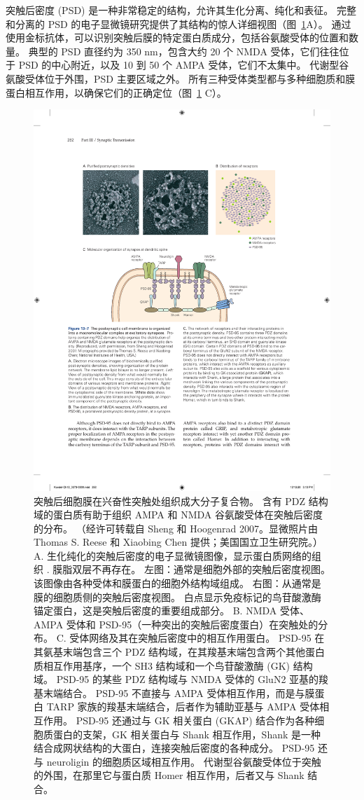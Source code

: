 突触后密度 (PSD) 是一种非常稳定的结构，允许其生化分离、纯化和表征。
完整和分离的 PSD 的电子显微镜研究提供了其结构的惊人详细视图（图~\ref{fig:13_7}A）。 
通过使用金标抗体，可以识别突触后膜的特定蛋白质成分，包括谷氨酸受体的位置和数量。
典型的 PSD 直径约为 350 nm，包含大约 20 个 NMDA 受体，它们往往位于 PSD 的中心附近，以及 10 到 50 个 AMPA 受体，它们不太集中。
代谢型谷氨酸受体位于外围，PSD 主要区域之外。
所有三种受体类型都与多种细胞质和膜蛋白相互作用，以确保它们的正确定位（图~\ref{fig:13_7} C）。


\begin{figure}[htbp]
	\centering
	\includegraphics[width=0.7\linewidth]{chap13/fig_13_7}
	\caption{突触后细胞膜在兴奋性突触处组织成大分子复合物。 含有 PDZ 结构域的蛋白质有助于组织 AMPA 和 NMDA 谷氨酸受体在突触后密度的分布。 （经许可转载自 Sheng 和 Hoogenrad 2007。显微照片由 Thomas S. Reese 和 Xiaobing Chen 提供；美国国立卫生研究院。）A. 生化纯化的突触后密度的电子显微镜图像，显示蛋白质网络的组织 . 膜脂双层不再存在。 左图：通常是细胞外部的突触后密度视图。 该图像由各种受体和膜蛋白的细胞外结构域组成。 右图：从通常是膜的细胞质侧的突触后密度视图。 白点显示免疫标记的鸟苷酸激酶锚定蛋白，这是突触后密度的重要组成部分。 B. NMDA 受体、AMPA 受体和 PSD-95（一种突出的突触后密度蛋白）在突触处的分布。 C. 受体网络及其在突触后密度中的相互作用蛋白。 PSD-95 在其氨基末端包含三个 PDZ 结构域，在其羧基末端包含两个其他蛋白质相互作用基序，一个 SH3 结构域和一个鸟苷酸激酶 (GK) 结构域。 PSD-95 的某些 PDZ 结构域与 NMDA 受体的 GluN2 亚基的羧基末端结合。 PSD-95 不直接与 AMPA 受体相互作用，而是与膜蛋白 TARP 家族的羧基末端结合，后者作为辅助亚基与 AMPA 受体相互作用。 PSD-95 还通过与 GK 相关蛋白 (GKAP) 结合作为各种细胞质蛋白的支架，GK 相关蛋白与 Shank 相互作用，Shank 是一种结合成网状结构的大蛋白，连接突触后密度的各种成分。 PSD-95 还与 neuroligin 的细胞质区域相互作用。 代谢型谷氨酸受体位于突触的外围，在那里它与蛋白质 Homer 相互作用，后者又与 Shank 结合。}
	\label{fig:13_7}
\end{figure}


